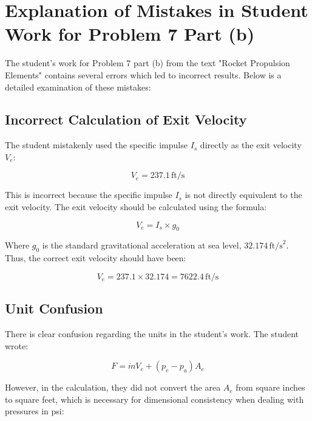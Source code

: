 \documentclass{article}
\begin{document}
\section{Explanation of Mistakes in Student Work for Problem 7 Part (b)}

The student's work for Problem 7 part (b) from the text "Rocket Propulsion Elements" contains several errors which led to incorrect results. Below is a detailed examination of these mistakes:

\subsection{Incorrect Calculation of Exit Velocity}

The student mistakenly used the specific impulse \( I_s \) directly as the exit velocity \( V_e \):

\begin{equation}
V_e = 237.1 \, \text{ft/s}
\end{equation}

This is incorrect because the specific impulse \( I_s \) is not directly equivalent to the exit velocity. The exit velocity should be calculated using the formula:

\begin{equation}
V_e = I_s \times g_0
\end{equation}

Where \( g_0 \) is the standard gravitational acceleration at sea level, \( 32.174 \, \text{ft/s}^2 \). Thus, the correct exit velocity should have been:

\begin{equation}
V_e = 237.1 \times 32.174 = 7622.4 \, \text{ft/s}
\end{equation}

\subsection{Unit Confusion}

There is clear confusion regarding the units in the student's work. The student wrote:

\begin{equation}
F = \dot{m} V_e + (p_e - p_a) A_e
\end{equation}

However, in the calculation, they did not convert the area \( A_e \) from square inches to square feet, which is necessary for dimensional consistency when dealing with pressures in psi:
\end{document}

